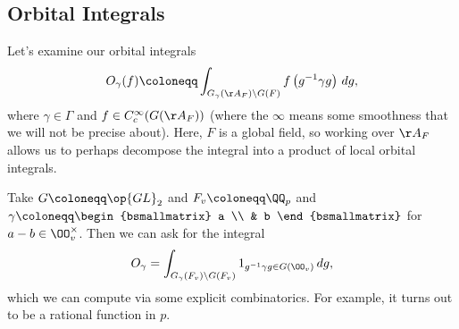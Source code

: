 \documentclass{article}
\begin{document}
\subsection{Orbital Integrals}
Let's examine our orbital integrals
\[O_\gamma(f)\coloneqq\int_{G_\gamma(\AA_F)\backslash G(F)}f\left(g^{-1}\gamma g\right)\,dg,\]
where $\gamma\in\Gamma$ and $f\in C_c^\infty(G(\AA_F))$ (where the $\infty$ means some smoothness that we will not be precise about). Here, $F$ is a global field, so working over $\AA_F$ allows us to perhaps decompose the integral into a product of local orbital integrals.
\begin{example}
	Take $G\coloneqq\op{GL}_2$ and $F_v\coloneqq\QQ_p$ and $\gamma\coloneqq\begin{bsmallmatrix}
		a \\ & b
	\end{bsmallmatrix}$ for $a-b\in\OO_v^\times$. Then we can ask for the integral
	\[O_\gamma=\int_{G_\gamma(F_v)\backslash G(F_v)}1_{g^{-1}\gamma g\in G(\OO_v)}\,dg,\]
	which we can compute via some explicit combinatorics. For example, it turns out to be a rational function in $p$.
\end{example}
\end{document}
